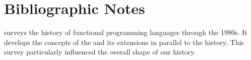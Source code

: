 \label{functional:history}




\section{Bibliographic Notes}
\citet{Hudak:Conception:1989} surveys the history of functional programming languages through the 1980s. It develops the concepts of the \lambdacalc and its extensions in parallel to the history. This survey particularly influenced the overall shape of our history.

